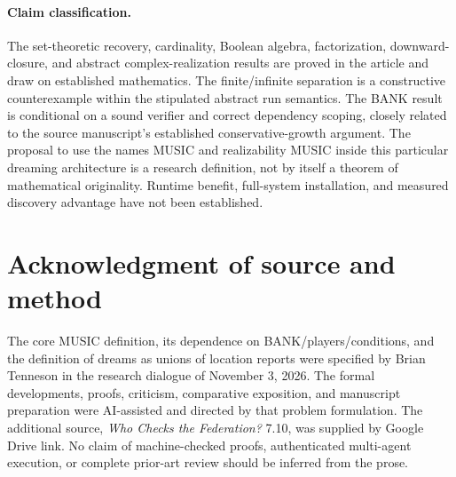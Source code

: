 \documentclass[11pt,letterpaper]{article}
\theoremstyle{definition}
\theoremstyle{remark}
\begin{document}
\paragraph{Claim classification.} The set-theoretic recovery, cardinality, Boolean algebra, factorization, downward-closure, and abstract complex-realization results are proved in the article and draw on established mathematics. The finite/infinite separation is a constructive counterexample within the stipulated abstract run semantics. The BANK result is conditional on a sound verifier and correct dependency scoping, closely related to the source manuscript's established conservative-growth argument. The proposal to use the names MUSIC and realizability MUSIC inside this particular dreaming architecture is a research definition, not by itself a theorem of mathematical originality. Runtime benefit, full-system installation, and measured discovery advantage have not been established.

\section*{Acknowledgment of source and method}
The core MUSIC definition, its dependence on BANK/players/conditions, and the definition of dreams as unions of location reports were specified by Brian Tenneson in the research dialogue of November 3, 2026. The formal developments, proofs, criticism, comparative exposition, and manuscript preparation were AI-assisted and directed by that problem formulation. The additional source, \emph{Who Checks the Federation?} 7.10, was supplied by Google Drive link. No claim of machine-checked proofs, authenticated multi-agent execution, or complete prior-art review should be inferred from the prose.
\end{document}
